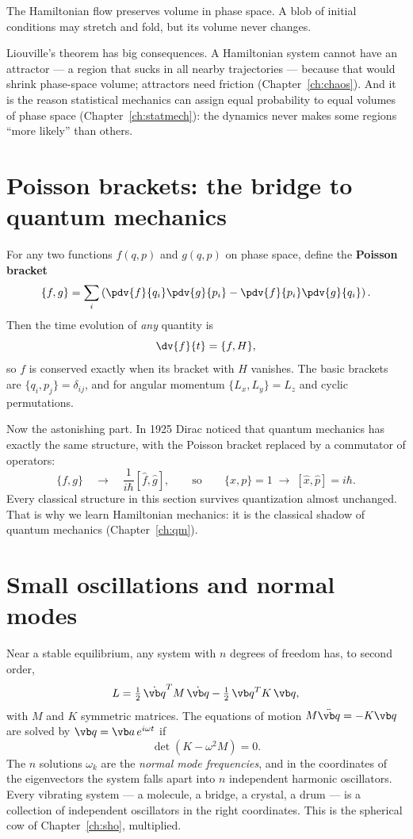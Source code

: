 \begin{theorem}
The Hamiltonian flow preserves volume in phase space. A blob of initial conditions may stretch and fold, but its volume never changes.
\end{theorem}

Liouville's theorem has big consequences. A Hamiltonian system cannot have an attractor --- a region that sucks in all nearby trajectories --- because that would shrink phase-space volume; attractors need friction (Chapter~\ref{ch:chaos}). And it is the reason statistical mechanics can assign equal probability to equal volumes of phase space (Chapter~\ref{ch:statmech}): the dynamics never makes some regions ``more likely'' than others.

\section{Poisson brackets: the bridge to quantum mechanics}

For any two functions $f(q,p)$ and $g(q,p)$ on phase space, define the \textbf{Poisson bracket}
\[
  \{f,g\} = \sum_i\left(\pdv{f}{q_i}\pdv{g}{p_i} - \pdv{f}{p_i}\pdv{g}{q_i}\right).
\]
Then the time evolution of \emph{any} quantity is
\[
  \dv{f}{t} = \{f,H\},
\]
so $f$ is conserved exactly when its bracket with $H$ vanishes. The basic brackets are $\{q_i,p_j\} = \delta_{ij}$, and for angular momentum $\{L_x, L_y\} = L_z$ and cyclic permutations.

Now the astonishing part. In 1925 Dirac noticed that quantum mechanics has exactly the same structure, with the Poisson bracket replaced by a commutator of operators:
\[
  \{f,g\} \quad\longrightarrow\quad \frac{1}{i\hbar}[\hat f,\hat g], \qquad\text{so}\qquad \{x,p\}=1 \;\longrightarrow\; [\hat x,\hat p] = i\hbar .
\]
Every classical structure in this section survives quantization almost unchanged. That is why we learn Hamiltonian mechanics: it is the classical shadow of quantum mechanics (Chapter~\ref{ch:qm}).

\section{Small oscillations and normal modes}

Near a stable equilibrium, any system with $n$ degrees of freedom has, to second order,
\[
  L = \tfrac12\,\dot{\vb q}^{T} M\,\dot{\vb q} - \tfrac12\,\vb q^{T}K\,\vb q,
\]
with $M$ and $K$ symmetric matrices. The equations of motion $M\ddot{\vb q} = -K\vb q$ are solved by $\vb q = \vb a\,e^{i\omega t}$ if
\[
  \det(K - \omega^2 M) = 0 .
\]
The $n$ solutions $\omega_k$ are the \emph{normal mode frequencies}, and in the coordinates of the eigenvectors the system falls apart into $n$ independent harmonic oscillators. Every vibrating system --- a molecule, a bridge, a crystal, a drum --- is a collection of independent oscillators in the right coordinates. This is the spherical cow of Chapter~\ref{ch:sho}, multiplied.

